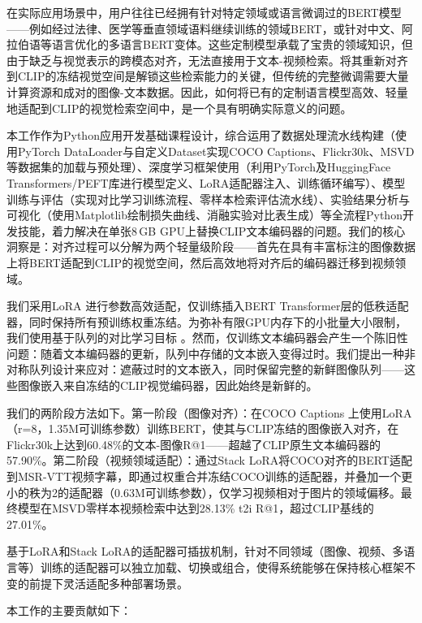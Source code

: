 \documentclass[10pt,a4paper]{ctexart}
\begin{document}
在实际应用场景中，用户往往已经拥有针对特定领域或语言微调过的BERT模型——例如经过法律、医学等垂直领域语料继续训练的领域BERT，或针对中文、阿拉伯语等语言优化的多语言BERT变体。这些定制模型承载了宝贵的领域知识，但由于缺乏与视觉表示的跨模态对齐，无法直接用于文本-视频检索。将其重新对齐到CLIP的冻结视觉空间是解锁这些检索能力的关键，但传统的完整微调需要大量计算资源和成对的图像-文本数据。因此，如何将已有的定制语言模型高效、轻量地适配到CLIP的视觉检索空间中，是一个具有明确实际意义的问题。

本工作作为Python应用开发基础课程设计，综合运用了数据处理流水线构建（使用PyTorch DataLoader与自定义Dataset实现COCO Captions、Flickr30k、MSVD等数据集的加载与预处理）、深度学习框架使用（利用PyTorch及HuggingFace Transformers/PEFT库进行模型定义、LoRA适配器注入、训练循环编写）、模型训练与评估（实现对比学习训练流程、零样本检索评估流水线）、实验结果分析与可视化（使用Matplotlib绘制损失曲线、消融实验对比表生成）等全流程Python开发技能，着力解决在单张8\,GB GPU上替换CLIP文本编码器的问题。我们的核心洞察是：对齐过程可以分解为两个轻量级阶段——首先在具有丰富标注的图像数据上将BERT适配到CLIP的视觉空间，然后高效地将对齐后的编码器迁移到视频领域。

我们采用LoRA \citep{hu2022lora}进行参数高效适配，仅训练插入BERT Transformer层的低秩适配器，同时保持所有预训练权重冻结。为弥补有限GPU内存下的小批量大小限制，我们使用基于队列的对比学习目标 \citep{he2020moco}。然而，仅训练文本编码器会产生一个陈旧性问题：随着文本编码器的更新，队列中存储的文本嵌入变得过时。我们提出一种非对称队列设计来应对：遮蔽过时的文本嵌入，同时保留完整的新鲜图像队列——这些图像嵌入来自冻结的CLIP视觉编码器，因此始终是新鲜的。

我们的两阶段方法如下。第一阶段（图像对齐）：在COCO Captions \citep{lin2014coco}上使用LoRA（r=8，1.35M可训练参数）训练BERT，使其与CLIP冻结的图像嵌入对齐，在Flickr30k上达到60.48\%的文本-图像R@1——超越了CLIP原生文本编码器的57.90\%。第二阶段（视频领域适配）：通过Stack LoRA将COCO对齐的BERT适配到MSR-VTT视频字幕，即通过权重合并冻结COCO训练的适配器，并叠加一个更小的秩为2的适配器（0.63M可训练参数），仅学习视频相对于图片的领域偏移。最终模型在MSVD零样本视频检索中达到28.13\% t2i R@1，超过CLIP基线的27.01\%。

基于LoRA和Stack LoRA的适配器可插拔机制，针对不同领域（图像、视频、多语言等）训练的适配器可以独立加载、切换或组合，使得系统能够在保持核心框架不变的前提下灵活适配多种部署场景。

本工作的主要贡献如下：
\end{document}
